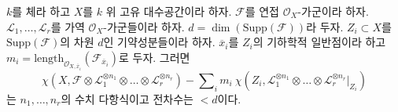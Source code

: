 \begin{lemma}
\label{lemma-numerical-polynomial-leading-term}
$k$를 체라 하고 $X$를 $k$ 위 고유 대수공간이라 하자. $\mathcal{F}$를 연접
$\mathcal{O}_X$-가군이라 하자. $\mathcal{L}_1, \ldots, \mathcal{L}_r$를 가역
$\mathcal{O}_X$-가군들이라 하자.
$d = \dim(\text{Supp}(\mathcal{F}))$라 두자.
$Z_i \subset X$를 $\text{Supp}(\mathcal{F})$의 차원 $d$인 기약성분들이라
하자. $\overline{x}_i$를 $Z_i$의 기하학적 일반점이라 하고
$m_i = \text{length}_{\mathcal{O}_{X, \overline{x}_i}}
(\mathcal{F}_{\overline{x}_i})$로 두자. 그러면
$$
\chi(X, \mathcal{F} \otimes \mathcal{L}_1^{\otimes n_1} \otimes \ldots \otimes
\mathcal{L}_r^{\otimes n_r}) -
\sum\nolimits_i
m_i\ \chi(Z_i, \mathcal{L}_1^{\otimes n_1} \otimes \ldots \otimes
\mathcal{L}_r^{\otimes n_r}|_{Z_i})
$$
는 $n_1, \ldots, n_r$의 수치 다항식이고 전차수는 $< d$이다.
\end{lemma}

